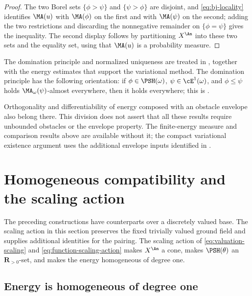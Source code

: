 \begin{proof}
The two Borel sets $\{\phi>\psi\}$ and $\{\psi>\phi\}$ are disjoint, and
\eqref{eq:bj-locality} identifies $\MA(u)$ with $\MA(\phi)$ on the
first and with $\MA(\psi)$ on the second; adding the two restrictions and
discarding the nonnegative remainder on $\{\phi=\psi\}$ gives the
inequality.  The second display follows by partitioning $X^{\An}$ into these
two sets and the equality set, using that $\MA(u)$ is a probability
measure.
\end{proof}

\begin{remark}
\label{rem:ch46-not-proved-locality}
The domination principle and normalized uniqueness are treated in
, together with the energy estimates that
support the variational method. The domination principle has the
following orientation: if $\phi\in\PSH(\omega)$, $\psi\in\cE^1(\omega)$,
and $\phi\le\psi$ holds $\MA_\omega(\psi)$-almost everywhere, then it
holds everywhere; this is \cite[Corollary~10.6]{BJ22}.

Orthogonality and differentiability of energy composed with an obstacle
envelope also belong there. This division does not assert that all
these results require unbounded obstacles or the envelope property.
The finite-energy measure and comparison results above are available
without it; the compact variational existence argument uses the
additional envelope inputs identified in .
\end{remark}

\section{Homogeneous compatibility and the scaling action}
\label{sec:ch46-homogeneous}

The preceding constructions have counterparts over a discretely valued
base.  The scaling action in this section preserves the fixed trivially
valued ground field and supplies additional identities for the pairing.  The scaling action of
\eqref{eq:valuation-scaling} and \eqref{eq:function-scaling-action} makes
$X^{\An}$ a cone, makes $\PSH(\theta)$ an $\mathbf R_{>0}$-set, and
makes the energy homogeneous of degree one.

\subsection{Energy is homogeneous of degree one}
\label{sec:ch46-scaling-energy}

